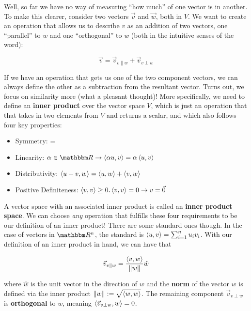 \documentclass[letterpaper,12pt]{report}
\providecommand{\tightlist}{%
  \setlength{\itemsep}{0pt}\setlength{\parskip}{0pt}}
\begin{document}
Well, so far we have no way of measuring ``how much'' of one vector is in another.
To make this clearer, consider two vectors \(\vec{v}\) and \(\vec{w}\), both in \(V\).
We want to create an operation that allows us to describe \(v\) as an addition of two vectors,
one ``parallel'' to \(w\) and one ``orthogonal'' to \(w\)
(both in the intuitive senses of the word):

\[\vec{v} = \vec{v}_{v\parallel w} + \vec{v}_{v\perp w}\]
 

If we have an operation that gets us one of the two component vectors, we can
always define the other as a subtraction from the resultant vector.
Turns out, we focus on similarity more (what a pleasant thought)!
More specifically, we need to 
define an \textbf{inner product} \innerprod{} over the vector space \(V\),
which is just an operation that that takes in two elements from \(V\) and returns a scalar,
and which also follows four key properties:
\begin{itemize}
  \tightlist
  \item
    Symmetry: \innerprod[u][v] = \innerprod[v][u]
  \item
    Linearity: \(\alpha \in \domain{R} 
          \rightarrow \innerprod[\alpha u][v] = \alpha \innerprod[u][v]\)
  \item
    Distributivity:
      \(\innerprod[u+v][w] = \innerprod[u][w] + \innerprod[v][w]\)
  \item
    Positive Definiteness:
      \(\innerprod[v][v] \geq 0. \innerprod[v][v] = 0 \rightarrow v = \vec{0}\)
\end{itemize}

A vector space with an associated inner product is called an \textbf{inner product space}.
We can choose \emph{any} operation that fulfills these four requirements to be our
definition of an inner product! There are some standard ones though.
In the case of vectors in \(\domain{R^n}\), the standard is
\(\innerprod[u][v] = \sum_{i=1}^{n}u_i v_i \).
With our definition of an inner product in hand, we can have that

\[\vec{v}_{v\parallel w} = \frac{\innerprod[v][w]}{\norm[w]} \hat{w} \]

where \(\hat{w}\) is the unit vector in the direction of \(w\) and the 
\textbf{norm}
of the vector \(w\)
is defined via the inner product \(\norm[w] := \sqrt{\innerprod[w][w]}\).
The remaining component \(\vec{v}_{v\perp w}\) is \textbf{orthogonal} to \(w\),
meaning \(\innerprod[\vec{v}_{v\perp w}][w] = 0\).
\par 
\end{document}
